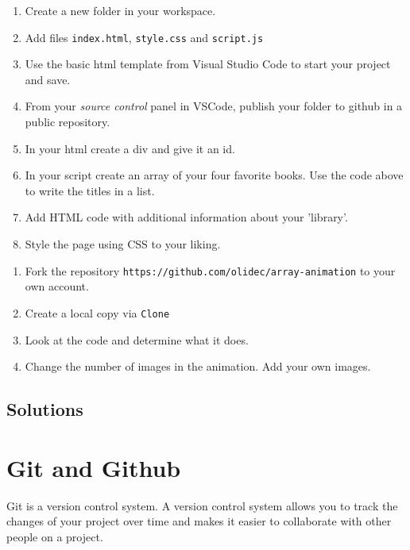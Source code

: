 \documentclass[english,11pt,a4paper]{report}
\begin{document}
\begin{ex}
\begin{enumerate}
\item Create a new folder in your workspace.
\item Add files \verb|index.html|, \verb|style.css| and \verb|script.js|
\item Use the basic html template from Visual Studio Code to start your project and save.
\item From your \emph{source control} panel in VSCode, publish your folder to github in a public repository.
\item In your html create a div and give it an id.
\item In your script create an array of your four favorite books. Use the code above to write the titles in a list.
\item Add HTML code with additional information about your 'library'.
\item Style the page using CSS to your liking.
\end{enumerate}
\end{ex}

\begin{ex}
\begin{enumerate}
\item Fork the repository \verb|https://github.com/olidec/array-animation| to your own account.
\item Create a local copy via \verb|Clone|
\item Look at the code and determine what it does.
\item Change the number of images in the animation. Add your own images.
\end{enumerate}
\end{ex}



\newpage


\subsection{Solutions}
\printcursols

\newpage



\newpage

\section{Git and Github}

Git is a version control system.  A version control system allows you to track the changes of your project over time and makes it easier to collaborate with other people on a project.
\end{document}
